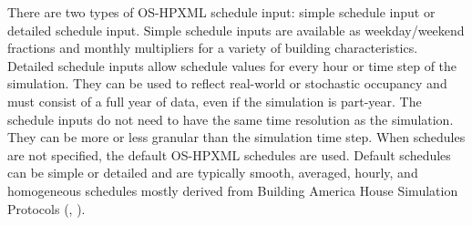 There are two types of OS-HPXML schedule input: simple schedule input or detailed schedule input. Simple schedule inputs are available as weekday/weekend fractions and monthly multipliers for a variety of building characteristics. Detailed schedule inputs allow schedule values for every hour or time step of the simulation. They can be used to reflect real-world or stochastic occupancy and must consist of a full year of data, even if the simulation is part-year. The schedule inputs do not need to have the same time resolution as the simulation. They can be more or less granular than the simulation time step. When schedules are not specified, the default OS-HPXML schedules are used. Default schedules can be simple or detailed and are typically smooth, averaged, hourly, and homogeneous schedules mostly derived from Building America House Simulation Protocols (\cite{bahsp_2010}, \cite{Wilson2014}).




